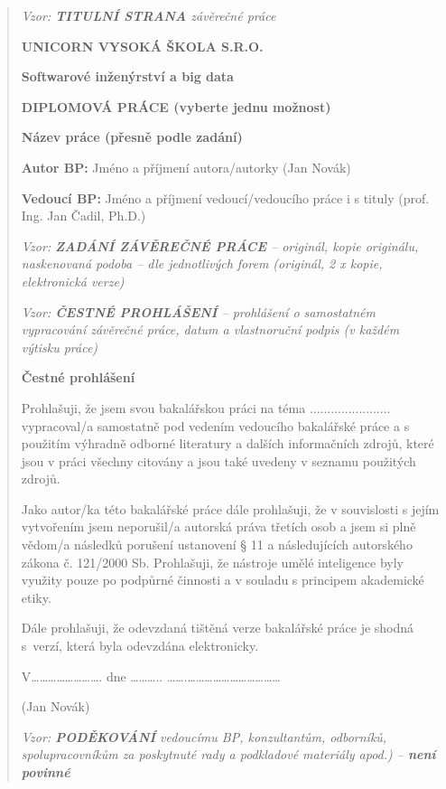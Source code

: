 \documentclass[
]{article}
\begin{document}
\newpage
\begin{quote}
\thispagestyle{empty}
\emph{Vzor: \textbf{TITULNÍ STRANA} závěrečné práce}

\textbf{UNICORN VYSOKÁ ŠKOLA S.R.O.}

\textbf{Softwarové inženýrství a big data}


\textbf{DIPLOMOVÁ PRÁCE (vyberte jednu možnost)}

\textbf{Název práce (přesně podle zadání)}

\textbf{Autor BP:} Jméno a příjmení autora/autorky (Jan Novák)

\textbf{Vedoucí BP:} Jméno a příjmení vedoucí/vedoucího práce i s tituly
(prof. Ing. Jan Čadil, Ph.D.)

\newpage
\thispagestyle{empty}
\emph{Vzor: \textbf{ZADÁNÍ ZÁVĚREČNÉ PRÁCE} -- originál, kopie
originálu, naskenovaná podoba -- dle jednotlivých forem (originál, 2 x
kopie, elektronická verze)}

\newpage
\thispagestyle{empty}
\emph{Vzor: \textbf{ČESTNÉ PROHLÁŠENÍ} -- prohlášení o samostatném
vypracování závěrečné práce, datum a vlastnoruční podpis (v každém
výtisku práce)}

\textbf{Čestné prohlášení}

Prohlašuji, že jsem svou bakalářskou práci na téma
....................... vypracoval/a samostatně pod vedením vedoucího
bakalářské práce a s použitím výhradně odborné literatury a dalších
informačních zdrojů, které jsou v práci všechny citovány a jsou také
uvedeny v seznamu použitých zdrojů.

Jako autor/ka této bakalářské práce dále prohlašuji, že v souvislosti s
jejím vytvořením jsem neporušil/a autorská práva třetích osob a jsem si
plně vědom/a následků porušení ustanovení § 11 a následujících
autorského zákona č. 121/2000 Sb. Prohlašuji, že nástroje umělé inteligence byly využity pouze po podpůrné činnosti a v souladu s principem akademické etiky.

Dále prohlašuji, že odevzdaná tištěná verze bakalářské práce je shodná
s~verzí, která byla odevzdána elektronicky.

V\ldots\ldots\ldots\ldots\ldots\ldots\ldots\ldots. dne
\ldots\ldots\ldots..
\ldots\ldots.\ldots\ldots\ldots\ldots\ldots\ldots\ldots\ldots\ldots\ldots\ldots{}

(Jan Novák)

\newpage
\thispagestyle{empty}
\emph{Vzor: \textbf{PODĚKOVÁNÍ} vedoucímu BP, konzultantům, odborníků,
spolupracovníkům za poskytnuté rady a podkladové materiály apod.) --
\textbf{není povinné}}


\end{quote}
\end{document}
